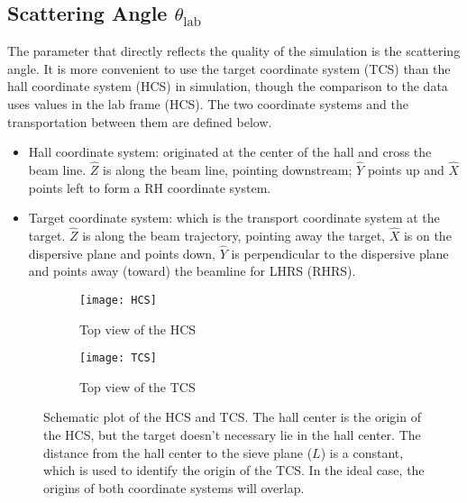 
\subsection{Scattering Angle $\theta_{\text{lab}}$}
The parameter that directly reflects the quality of the simulation is the scattering
angle. It is more convenient to use the target coordinate system (TCS) 
than the hall coordinate system (HCS) in simulation, though the comparison to
the data uses values in the lab frame (HCS). The two coordinate systems and the transportation
between them are defined below.

\begin{itemize}
    \item Hall coordinate system: originated at the center of the hall and
	cross the beam line.  $\hat{Z}$ is along the beam line, pointing downstream; 
	$\hat{Y}$ points up and $\hat{X}$ points left to form a RH coordinate system.
    \item Target coordinate system: which is the transport coordinate system at the target.
	$\hat{Z}$ is along the beam trajectory, pointing away the target, 
	$\hat{X}$ is on the dispersive plane and points down, $\hat{Y}$ is perpendicular
	to the dispersive plane and points away (toward) the beamline for LHRS (RHRS).
\end{itemize}

\begin{figure}[!h]
    \begin{subfigure}[b]{0.5\textwidth}
	\texttt{[image: HCS]}
	\caption{Top view of the HCS}
    \end{subfigure}
    \begin{subfigure}[b]{0.5\textwidth}
	\texttt{[image: TCS]}
	\caption{Top view of the TCS}
    \end{subfigure}
    \caption[HCS and TCS]
    {Schematic plot of the HCS and TCS. The hall center is the origin of 
    the HCS, but the target doesn't necessary lie in the hall center. The distance
    from the hall center to the sieve plane ($L$) is a constant, which is used to
    identify the origin of the TCS. In the ideal case, the origins of both coordinate
    systems will overlap.}
\end{figure}

